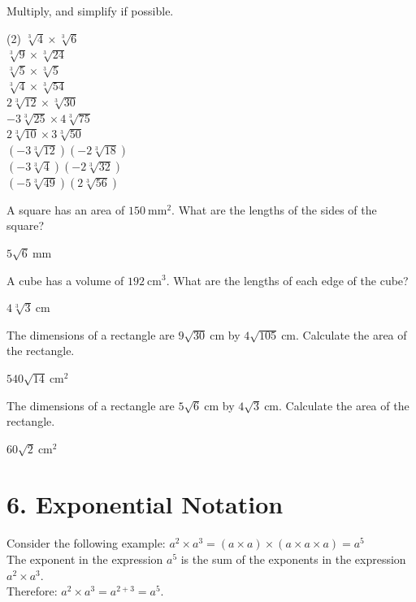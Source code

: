 \documentclass[12pt,fleqn]{book}
\newcommand{\prb}[1]{\begin{Exercise}#1\end{Exercise}}
\newcommand{\sol}[1]{\begin{Answer}#1\end{Answer}}
\begin{document}
\prb{
    Multiply, and simplify if possible.
    \begin{tasks}(2)
        \task $\sqrt[3]{4} \times \sqrt[3]{6}$
        \\[2in]
        \task $\sqrt[3]{9} \times \sqrt[3]{24}$
        \\[2in]
        \task $\sqrt[3]{5} \times \sqrt[3]{5}$
        \\[2in]
        \task $\sqrt[3]{4} \times \sqrt[3]{54}$
        \\[2in]
        \task $2 \sqrt[3]{12} \times \sqrt[3]{30}$
        \\[2in]
        \task $-3 \sqrt[3]{25} \times 4 \sqrt[3]{75}$
        \\[2in]
        \task $2 \sqrt[3]{10} \times 3 \sqrt[3]{50}$
        \\[2in]
        \task $(-3 \sqrt[3]{12})(-2 \sqrt[3]{18})$
        \\[2in]
        \task $(-3 \sqrt[3]{4})(-2 \sqrt[3]{32})$
        \\[2in]
        \task $(-5 \sqrt[3]{49})(2 \sqrt[3]{56})$
        \\[2in]
    \end{tasks}
}

\prb{
    A square has an area of $150 \mathrm{~mm}^2$. What are the lengths of the sides of the square?
    \\[2in]
}
\sol{$5 \sqrt{6} \mathrm{~mm}$}
\prb{
    A cube has a volume of $192 \mathrm{~cm}^3$. What are the lengths of each edge of the cube?
    \\[2in]
}
\sol{$4 \sqrt[3]{3} \mathrm{~cm}$}
\prb{
    The dimensions of a rectangle are $9 \sqrt{30} \mathrm{~cm}$ by $4 \sqrt{105} \mathrm{~cm}$. Calculate the area of the rectangle.
    \\[2in]
}
\sol{$540 \sqrt{14} \mathrm{~cm}^2$}
\prb{
    The dimensions of a rectangle are $5 \sqrt{6} \mathrm{~cm}$ by $4 \sqrt{3} \mathrm{~cm}$. Calculate the area of the rectangle.
    \\[2in]
}
\sol{$60 \sqrt{2} \mathrm{~cm}^2$}


\chapter{6. Exponential Notation}
Consider the following example: $a^{2} \times a^{3}=(a \times a) \times(a \times a \times a)=a^{5}$\\
The exponent in the expression $a^{5}$ is the sum of the exponents in the expression $a^{2} \times a^{3}$.\\
Therefore: $a^{2} \times a^{3}=a^{2+3}=a^{5}$.
\end{document}
